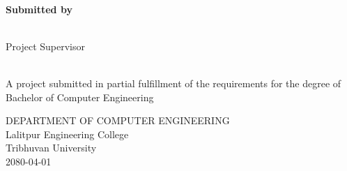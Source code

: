 \begin{center}
    \linespread{1.6}
    \thispagestyle{empty}
    \textbf{\large{\thetitle}} \\
    \vspace{2cm}

    \textbf{Submitted by} \\
    {\theauthor} \\

    \vspace{2cm}

    Project Supervisor\\
    {\thesupervisor} \\

    \vspace{2.2cm}

    A project submitted in partial fulfillment of the requirements for the degree of\\
    Bachelor of Computer Engineering

    \vspace{3cm}

    DEPARTMENT OF COMPUTER ENGINEERING \\
    Lalitpur Engineering College\\
    Tribhuvan University\\
    \vspace{2.4 in}
    2080-04-01

\end{center}
